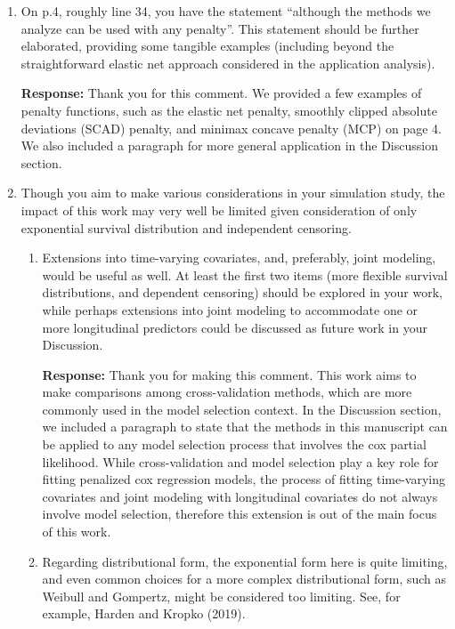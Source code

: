 \documentclass[12]{article}
\newcommand{\re}{\textbf{Response: }}
\begin{document}
\begin{enumerate}[align = left]
\item On p.4, roughly line 34, you have the statement “although the methods we analyze can be used with any penalty”.  This statement should be further elaborated, providing some tangible examples (including beyond the straightforward elastic net approach considered in the application analysis).

\re Thank you for this comment. We provided a few examples of penalty functions, such as the elastic net penalty, smoothly clipped absolute deviations (SCAD) penalty, and minimax concave penalty (MCP) on page 4. We also included a paragraph for more general application in the Discussion section.

\item Though you aim to make various considerations in your simulation study, the impact of this work may very well be limited given consideration of only exponential survival distribution and independent censoring. 
    \begin{enumerate}
        \item Extensions into time-varying covariates, and, preferably, joint modeling, would be useful as well. At least the first two items (more flexible survival distributions, and dependent censoring) should be explored in your work, while perhaps extensions into joint modeling to accommodate one or more longitudinal predictors could be discussed as future work in your Discussion.
        
        \re Thank you for making this comment. This work aims to make comparisons among cross-validation methods, which are more commonly used in the model selection context. In the Discussion section, we included a paragraph to state that the methods in this manuscript can be applied to any model selection process that involves the cox partial likelihood. While cross-validation and model selection play a key role for fitting penalized cox regression models, the process of fitting time-varying covariates and joint modeling with longitudinal covariates do not always involve model selection, therefore this extension is out of the main focus of this work. 
        
        \item Regarding distributional form, the exponential form here is quite limiting, and even common choices for a more complex distributional form, such as Weibull and Gompertz, might be considered too limiting. See, for example, Harden and Kropko (2019).
        

\end{enumerate}
\end{enumerate}
\end{document}

